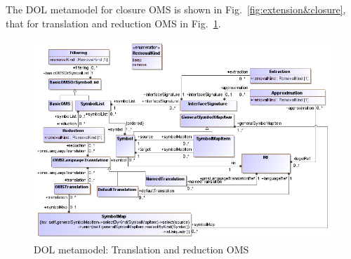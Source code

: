 \documentclass[10pt, a4paper]{isov2}
\makeatletter
\newcommand*\CommentAuthor{}
\renewcommand*\CommentAuthor{#1}}
\newcommand*\CommentDate{}
\renewcommand*\CommentDate{#1}}
\newcommand*\CommentId{}
\renewcommand*\CommentId{#1}}
\newcommand*\CommentType{}
\renewcommand*\CommentType{#1}}
\newcommand*{\SetCommentColorByType}[1]{%
\edef\localType{{#1}}%
\expandafter\ifstrequal\localType{q-aut}{\colorlet{CommentColor}{red}}{%
\expandafter\ifstrequal\localType{q-all}{\colorlet{CommentColor}{orange}}{%
\expandafter\ifstrequal\localType{todo}{\colorlet{CommentColor}{orange}}{%
\expandafter\ifstrequal\localType{fyi}{\colorlet{CommentColor}{lightgray}}{%
\colorlet{CommentColor}{yellow}}}}}}
\newcommand*{\SetCommentPrefixByType}[1]{%
\edef\localType{{#1}}%
\expandafter\@ifmtarg\localType{%
\edef\CommentPrefix{}%
}{%
\caseupper[q]{#1}%
\edef\CommentPrefix{\thestring: }%
}}
\newcommand*{\initComment}[1]{%
\setkeys{Comment}{#1}%
\SetCommentColorByType{\CommentType}%
\relax%
\SetCommentPrefixByType{\CommentType}%
\relax%
}
\newcommand*{\todonote}[2][]{%
\initComment{#1}%
\pdfcomment[author=\CommentAuthor,color=CommentColor,date=\CommentDate,id=\CommentId]{%
\CommentPrefix
#2}}
\renewcommand*{\todonote}[2][]{%
\initComment{#1}%
\ednote{\CommentPrefix #2}}
\newcommand*{\CLnote}[2][author=Christoph Lange]{%
\todonote[author=Christoph Lange,#1]{#2}}
\makeatother
\begin{document}
The DOL metamodel for closure OMS is shown in
Fig.~\ref{fig:extension&closure}, that for translation and reduction
OMS in Fig.~\ref{fig:translations&reduction}. 



\medskip
\begin{figure}
  \centering
    \includegraphics[scale=0.47]{mof/translation&reduction.png}
  \caption{DOL metamodel: Translation and reduction OMS}
  \label{fig:translations&reduction}
\end{figure}



 \label{a:dol-text:OMS}
\end{document}
